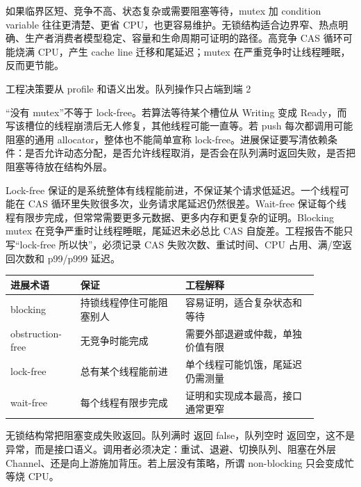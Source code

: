 如果临界区短、竞争不高、状态复杂或需要阻塞等待，mutex 加 condition variable 往往更清楚、更省 CPU，也更容易维护。无锁结构适合边界窄、热点明确、生产者消费者模型稳定、容量和生命周期可证明的路径。高竞争 CAS 循环可能烧满 CPU，产生 cache line 迁移和尾延迟；mutex 在严重竞争时让线程睡眠，反而更节能。

工程决策要从 profile 和语义出发。队列操作只占端到端 2%

“没有 mutex”不等于 lock-free。若算法等待某个槽位从 Writing 变成 Ready，而写该槽位的线程崩溃后无人修复，其他线程可能一直等。若 push 每次都调用可能阻塞的通用 allocator，整体也不能简单宣称 lock-free。进展保证要写清依赖条件：是否允许动态分配，是否允许线程取消，是否会在队列满时返回失败，是否把阻塞等待放在结构外层。

Lock-free 保证的是系统整体有线程能前进，不保证某个请求低延迟。一个线程可能在 CAS 循环里失败很多次，业务请求尾延迟仍然很差。Wait-free 保证每个线程有限步完成，但常常需要更多元数据、更多内存和更复杂的证明。Blocking mutex 在竞争严重时让线程睡眠，尾延迟未必总比 CAS 自旋差。工程报告不能只写“lock-free 所以快”，必须记录 CAS 失败次数、重试时间、CPU 占用、满/空返回次数和 p99/p999 延迟。

\begin{center}
\begin{tabular}{p{0.20\linewidth}p{0.30\linewidth}p{0.38\linewidth}}
\toprule
进展术语 & 保证 & 工程解释 \\
\midrule
blocking & 持锁线程停住可能阻塞别人 & 容易证明，适合复杂状态和等待 \\
obstruction-free & 无竞争时能完成 & 需要外部退避或仲裁，单独价值有限 \\
lock-free & 总有某个线程能前进 & 单个线程可能饥饿，尾延迟仍需测量 \\
wait-free & 每个线程有限步完成 & 证明和实现成本最高，接口通常更窄 \\
\bottomrule
\end{tabular}
\end{center}

无锁结构常把阻塞变成失败返回。队列满时  返回 false，队列空时  返回空，这不是异常，而是接口语义。调用者必须决定：重试、退避、切换队列、阻塞在外层 Channel、还是向上游施加背压。若上层没有策略，所谓 non-blocking 只会变成忙等烧 CPU。

